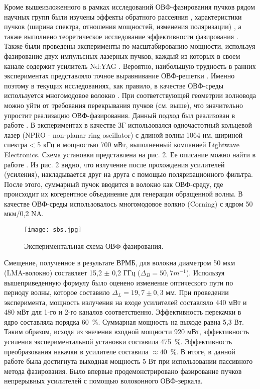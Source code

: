 Кроме вышеизложенного в рамках исследований ОВФ-фазирования пучков
рядом научных групп были изучены эффекты обратного рассеяния
\cite{125,128}, характеристики пучков (ширина спектра, отношения
мощностей, изменения поляризации) \cite{129}, а также выполнено
теоретическое исследование эффективности фазирования
\cite{1210,1211}. Также были проведены эксперименты по
масштабированию мощности, используя фазирование двух импульсных
лазерных пучков, каждый из которых в своем канале содержит усилитель
Nd:YAG \cite{1212,1213}. Вероятно, наибольшую трудность в ранних
экспериментах представляло точное выравнивание ОВФ-решетки
\cite{129,1211,1214}. Именно поэтому в текущих исследованиях, как
правило, в качестве ОВФ-среды используется многомодовое волокно
\cite{1215}. При соответствующей геометрии волновода можно уйти от
требования перекрывания пучков (см. выше), что значительно упростит
реализацию ОВФ-фазирования. Данный подход был реализован в работе
\cite{1216}. В экспериментах в качестве ЗГ использовался
одночастотный кольцевой лазер (NPRO - non-planar ring oscillator) с
длиной волны 1064 нм, шириной спектра < 5 кГц и мощностью 700 мВт,
выполненный компанией Lightwave Electronics. Схема установки
представлена на рис. 2. Ее описание можно найти в работе
\cite{1216}. Из рис. 2 видно, что излучение после прохождения
усилителей (усиления), накладывается друг на друга с помощью
поляризационного фильтра. После этого, суммарный пучок вводится в
волокно как ОВФ-среду, где происходит их когерентное объединение для
генерации обращенной волны. В качестве ОВФ-среды использовалось
многомодовое волкно (Corning) с ядром 50 мкм/0,2 NA.

\begin{figure}
\centering
\texttt{[image: sbs.jpg]}\\
\caption{Экспериментальная схема ОВФ-фазирования.} \label{sbsbeam}
\end{figure}

Смещение, полученное в результате ВРМБ, для волокна диаметром 50 мкм
(LMA-волокно) составляет 15,2 $\pm$ 0,2 ГГц ($\Delta_B = 50,7
m^{-1}$). Используя вышеприведенную формулу было оценено изменение
оптического пути по периоду волны, которое составило $\Delta_L =
19,7 \pm 0,3$ мм. При проведении эксперимента, мощность излучения на
входе усилителей составляло 440 мВт и 480 мВт для 1-го и 2-го
каналов соответственно. Эффективность перекачки в ядро составляла
порядка 60~\%. Суммарная мощность на выходе равна 5,3 Вт. Таким
образом, исходя из значения входной мощности 920 мВт, эффективность
усиления экспериментальной установки составила 475~\%. Эффективность
преобразования накачки в усилителе составила $\approx 40$~\%. В итоге, в
данной работе была достигнута выходная мощность 5 Вт при
использовании пассивного метода фазирования. Было впервые
продемонстрировано фазирование пучков непрерывных усилителей с
помощью волоконного ОВФ-зеркала.

